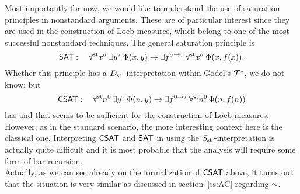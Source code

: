 Most importantly for now, we would like to understand the use of saturation principles in nonstandard arguments. These are of particular interest since they are used in the construction of Loeb measures, which belong to one of the most successful nonstandard techniques. 
The general saturation principle is
\[ \textsf{\upshape SAT}: \quad \forall^{\operatorname{st}{}}\! x^\sigma \, \exists y^\tau \, \Phi(x, y) \to \exists f^{\sigma \to \tau} \, \forall^{\operatorname{st}{}}\! x^\sigma \, \Phi(x, f(x)). \]
Whether this principle has a $\protect{D_{\operatorname{st}{}}}$-interpretation within G\"odel's $\mathcal{T}^*$, we do not know; but
\[ \textsf{\upshape CSAT}: \quad \forall^{\operatorname{st}{}}\! n^0 \, \exists y^\tau \, \Phi(n, y) \to \exists f^{0 \to \tau} \, \forall^{\operatorname{st}{}}\! n^0 \, \Phi(n, f(n)) \]
has and that seems to be sufficient for the construction of Loeb measures. However, as in the standard scenario, the more interesting
context here is the classical one. Interpreting $\textsf{\upshape CSAT}$ and $\textsf{\upshape SAT}$ in using the $\protect{S_{\operatorname{st}{}}}$-interpretation is actually quite difficult and it is most probable that the analysis will require some form of bar recursion. \\
Actually, as we can see already on the formalization of $\textsf{\upshape CSAT}$ above, it turns out that the situation is very similar as discussed in section~\ref{ss:AC} regarding $\AC$.


